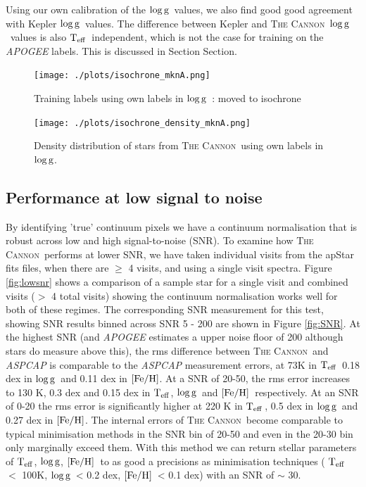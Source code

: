 \documentclass[12pt, preprint]{aastex}
\newcommand{\sectionname}{Section}
\newcommand{\teff}{\mbox{$\rm T_{eff}$}}
\newcommand{\feh}{\mbox{$\rm [Fe/H]$}}
\newcommand{\logg}{\mbox{$\rm \log g$}}
\newcommand{\tc}{\textsc{The Cannon}}
\begin{document}
Using our own calibration of the \logg\ values, we also find good  good agreement with Kepler \logg\ values. The difference between Kepler and \tc\ \logg\ values is also \teff\ independent, which is not the case for training on the \textit{APOGEE} labels. This is discussed in Section \sectionname{}.  


\begin{figure}[h!]
  \texttt{[image: ./plots/isochrone\_mknA.png]}
\caption{Training labels using own labels in \logg\ : moved to isochrone}
\label{fig:mknA}
\end{figure}

\begin{figure}[h!]
  \texttt{[image: ./plots/isochrone\_density\_mknA.png]}
\caption{Density distribution of stars from \tc\ using own labels in \logg.}
\label{fig:iso_density}
\end{figure}

 \subsection{Performance at low signal to noise}

By identifying 'true' continuum pixels we have a continuum normalisation that is robust across low and high signal-to-noise (SNR). To examine how \tc\ performs at lower SNR, we have taken individual visits from the apStar fits files, when there are $\ge$ 4 visits, and using a single visit spectra. Figure \ref{fig:lowsnr} shows a comparison of a sample star for a single visit and combined visits ($>$ 4 total visits) showing the continuum normalisation works well for both of these regimes. The corresponding SNR measurement for this test,  showing SNR results binned  across SNR 5 - 200 are shown in Figure \ref{fig:SNR}.  At the highest SNR (and \textit{APOGEE} estimates a upper noise floor of 200 although stars do measure above this), the rms difference between \tc\ and \textit{ASPCAP} is comparable to the \textit{ASPCAP} measurement errors, at 73K in \teff\, 0.18 dex in \logg\ and 0.11 dex in \feh.  At a SNR of 20-50, the rms error increases to 130 K, 0.3 dex and 0.15 dex in \teff, \logg\ and \feh\, respectively. At an SNR of 0-20 the rms error is significantly higher at 220 K in \teff\,, 0.5 dex in \logg\ and 0.27 dex in \feh. The internal errors of \tc\ become comparable to typical minimisation methods in the SNR bin of 20-50 and even in the 20-30 bin only marginally exceed them. With this method we can return stellar parameters of \teff, \logg, \feh\ to as good a precisions as minimisation techniques ( \teff\ $<$ 100K, \logg\ < 0.2 dex, \feh\ < 0.1 dex) with an SNR of $\sim$ 30. 
\end{document}

